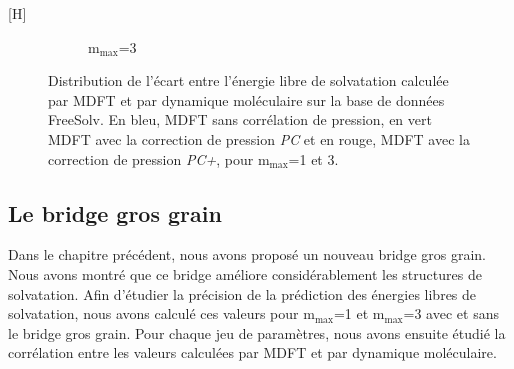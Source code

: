 \begin{center}[H]
\begin{figure}
\begin{subfigure}[b]{0.85\textwidth}
{         }
       \caption{$\mathrm{m}_\mathrm{max}$=3}
       \label{fig:distrib_error_PC_PCPlus:mmax3}
    \end{subfigure}
  \caption[Distribution de l'écart entre l'énergie libre de solvatation calculée par MDFT et par dynamique moléculaire sur la base de données FreeSolv.]{Distribution de l'écart entre l'énergie libre de solvatation calculée par MDFT et par dynamique moléculaire sur la base de données FreeSolv. En bleu, MDFT sans corrélation de pression, en vert MDFT avec la correction de pression \textit{PC} et en rouge, MDFT avec la correction de pression \textit{PC+}, pour $\mathrm{m}_\mathrm{max}$=1 et 3.}
  \label{fig:distrib_error_PC_PCPlus}
\end{figure}
\end{center}


\subsection{Le bridge gros grain}
Dans le chapitre précédent, nous avons proposé un nouveau bridge gros grain. Nous avons montré que ce bridge améliore considérablement les structures de solvatation. Afin d'étudier la précision de la prédiction des énergies libres de solvatation, nous avons calculé ces valeurs pour $\mathrm{m}_\mathrm{max}$=1 et $\mathrm{m}_\mathrm{max}$=3 avec et sans le bridge gros grain. Pour chaque jeu de paramètres, nous avons ensuite étudié la corrélation entre les valeurs calculées par MDFT et par dynamique moléculaire.



